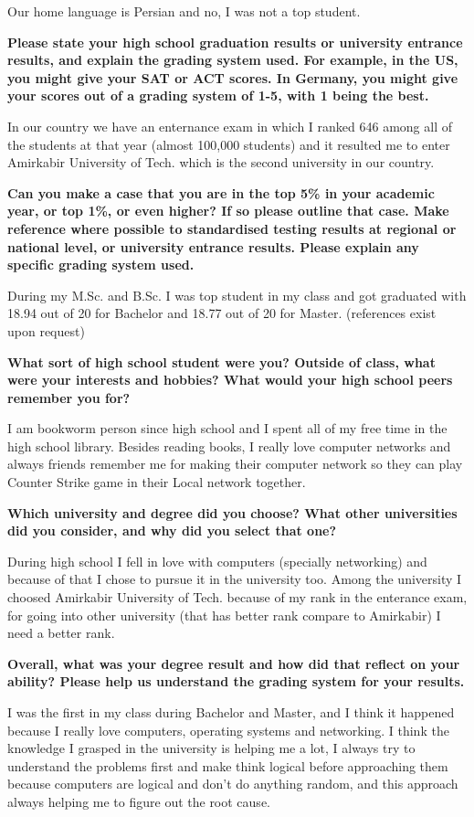 Our home language is Persian and no, I was not a top student.

\noindent
\textbf{Please state your high school graduation results or university entrance results, and explain the grading system used. For example, in the US, you might give your SAT or ACT scores.
In Germany, you might give your scores out of a grading system of 1-5, with 1 being the best.}

In our country we have an enternance exam in which I ranked 646 among all of the students at that year
(almost 100,000 students) and it resulted me to enter Amirkabir University of Tech. which is the second university in our country.

\noindent
\textbf{Can you make a case that you are in the top 5\% in your academic year, or top 1\%, or even higher?
If so please outline that case. Make reference where possible to standardised testing results at regional or national level, or university entrance results. Please explain any specific grading system used.}

During my M.Sc. and B.Sc. I was top student in my class and got graduated with 18.94 out of 20 for Bachelor and 18.77 out of 20 for Master.
(references exist upon request)

\noindent
\textbf{What sort of high school student were you? Outside of class, what were your interests and hobbies? What would your high school peers remember you for?}

I am bookworm person since high school and I spent all of my free time in the high school library.
Besides reading books, I really love computer networks and always friends remember me for making their computer network
so they can play Counter Strike game in their Local network together.

\noindent
\textbf{Which university and degree did you choose? What other universities did you consider, and why did you select that one?}

During high school I fell in love with computers (specially networking) and because of that I chose to pursue
it in the university too. Among the university I choosed Amirkabir University of Tech. because of my rank in the enterance exam,
for going into other university (that has better rank compare to Amirkabir) I need a better rank.

\noindent
\textbf{Overall, what was your degree result and how did that reflect on your ability? Please help us understand the grading system for your results.}

I was the first in my class during Bachelor and Master, and I think it happened because I really love computers,
operating systems and networking. I think the knowledge I grasped in the university is helping me a lot, I always
try to understand the problems first and make think logical before approaching them because computers are logical
and don't do anything random, and this approach always helping me to figure out the root cause.


